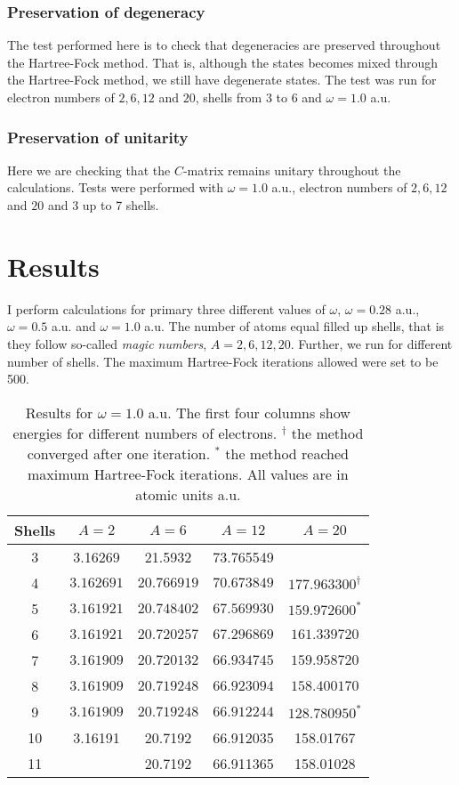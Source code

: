 \documentclass[11pt]{article}
\begin{document}
\subsubsection{Preservation of degeneracy}
The test performed here is to check that degeneracies are preserved throughout the Hartree-Fock method. That is, although the states becomes mixed through the Hartree-Fock method, we still have degenerate states. The test was run for electron numbers of $2,6,12$ and $20$, shells from $3$ to $6$ and $\omega=1.0$ a.u.

\subsubsection{Preservation of unitarity}
Here we are checking that the $C$-matrix remains unitary throughout the calculations. Tests were performed with $\omega = 1.0$ a.u., electron numbers of $2, 6, 12$ and $20$ and 3 up to 7 shells.

\section{Results}
I perform calculations for primary three different values of $\omega$, $\omega=0.28$ a.u., $\omega=0.5$ a.u. and $\omega=1.0$ a.u. The number of atoms equal filled up shells, that is they follow so-called \textit{magic numbers}, $A = 2, 6, 12, 20$. Further, we run for different number of shells. The maximum Hartree-Fock iterations allowed were set to be 500.

\begin{table}[H]
	\centering
	\caption{Results for $\omega = 1.0$ a.u. The first four columns show energies for different numbers of electrons. $^\dagger$ the method converged after one iteration. $^*$ the method reached maximum Hartree-Fock iterations. All values are in atomic units a.u.}
	\begin{tabular}{c c c c c}
		\\ \hline \hline
		Shells 	& $A = 2$	& $A = 6$ 	& $A = 12$ 	& $A = 20$ 	\\ \hline
         3 &    3.16269 &    21.5932 &  73.765549 &            \\ 
         4 & $  3.162691$ & $ 20.766919$ & $ 70.673849$ & $177.963300^\dagger$  \\ 
         5 & $  3.161921$ & $ 20.748402$ & $ 67.569930$ & $159.972600^*$  \\ 
         6 & $  3.161921$ & $ 20.720257$ & $ 67.296869$ & $161.339720$  \\ 
         7 & $  3.161909$ & $ 20.720132$ & $ 66.934745$ & $159.958720$  \\ 
         8 & $  3.161909$ & $ 20.719248$ & $ 66.923094$ & $158.400170$  \\ 
         9 & $  3.161909$ & $ 20.719248$ & $ 66.912244$ & $128.780950^*$  \\ 
        10 &    3.16191 &    20.7192 &  66.912035 &  158.01767  \\ 
        11 &            &    20.7192 &  66.911365 &  158.01028  \\ 
        \hline \hline
	\end{tabular}
	\label{tab:omega10}
\end{table}
\end{document}
